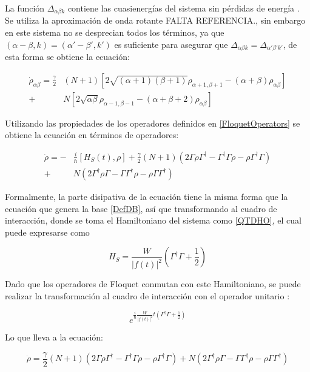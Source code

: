 \documentclass[a4paper,10pt]{report}
\begin{document}
La función $\Delta_{\alpha \beta k}$ contiene las cuasienergías del sistema sin pérdidas de energía \cite{HanngiDQS}. Se utiliza la aproximación de onda rotante FALTA REFERENCIA., sin embargo en este sistema no se desprecian todos los términos, ya que $(\alpha-\beta,k)=(\alpha'-\beta',k')$ es suficiente para asegurar que $\Delta_{\alpha \beta k}=\Delta_{\alpha' \beta' k'}$, de esta forma se obtiene la ecuación:

\begin{align*}
\dot{\rho}_{\alpha \beta} = \frac{\gamma}{2}&(N+1)[2\sqrt{(\alpha+1)(\beta + 1)}\rho_{\alpha+1,\beta+1} - (\alpha + \beta)\rho_{\alpha \beta}]\\
+& N[2\sqrt{\alpha \beta}\rho_{\alpha-1,\beta-1} - (\alpha + \beta + 2)\rho_{\alpha \beta}]
\end{align*}

Utilizando las propiedades de los operadores definidos en \ref{FloquetOperators} se obtiene la ecuación en términos de operadores:

\begin{align*}
\dot{\rho} = -&\frac{i}{\hbar}[H_S (t),\rho] + \frac{\gamma}{2}(N+1)(2\Gamma\rho\Gamma^\dagger - \Gamma^\dagger\Gamma \rho - \rho \Gamma^\dagger \Gamma )\\
 +& N(2\Gamma^\dagger \rho \Gamma - \Gamma \Gamma^\dagger \rho - \rho \Gamma\Gamma^\dagger)
\end{align*}

Formalmente, la parte disipativa de la ecuación tiene la misma forma que la ecuación que genera la base \ref{DefDB}, así que transformando al cuadro de interacción, donde se toma el Hamiltoniano del sistema como \ref{QTDHO}, el cual puede expresarse como\cite{BrownPT}

\begin{equation}
H_S = \frac{W}{|f(t)|^2}(\Gamma^\dagger \Gamma + \frac{1}{2})
\end{equation}

Dado que los operadores de Floquet conmutan con este Hamiltoniano, se puede realizar la transformación al cuadro de interacción con el operador unitario \cite{SakuraiQM}:

\begin{equation}
 e^{\frac{i}{\hbar}\frac{W}{|f(t)|^2}t(\Gamma^\dagger \Gamma + \frac{1}{2})}
\end{equation}

Lo que lleva a la ecuación:

\begin{equation}
\dot{\rho}=\frac{\gamma}{2}(N+1)(2\Gamma\rho\Gamma^\dagger - \Gamma^\dagger\Gamma \rho - \rho \Gamma^\dagger \Gamma )
 + N(2\Gamma^\dagger \rho \Gamma - \Gamma \Gamma^\dagger \rho - \rho \Gamma\Gamma^\dagger)
\end{equation}
\end{document}
